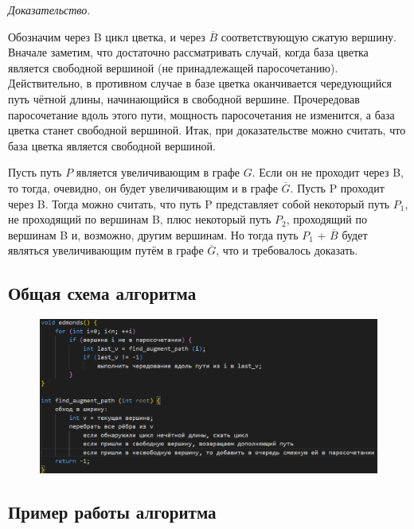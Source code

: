 \documentclass[14pt, a4paper]{extarticle}
\begin{document}
    \textit{Доказательство}. 
    
    Обозначим через B цикл цветка, и через $\overline B$ соответствующую сжатую вершину.
    Вначале заметим, что достаточно рассматривать случай, когда база цветка является свободной вершиной (не принадлежащей паросочетанию). Действительно, в противном случае в базе цветка оканчивается чередующийся путь чётной длины, начинающийся в свободной вершине. Прочередовав паросочетание вдоль этого пути, мощность паросочетания не изменится, а база цветка станет свободной вершиной. Итак, при доказательстве можно считать, что база цветка является свободной вершиной.

    Пусть путь $P$ является увеличивающим в графе $G$. Если он не проходит через B, то тогда, очевидно, он будет увеличивающим и в графе $\overline G$. Пусть P проходит через B. Тогда можно считать, что путь P представляет собой некоторый путь $P_1$, не проходящий по вершинам B, плюс некоторый путь $P_2$, проходящий по вершинам B и, возможно, другим вершинам. Но тогда путь $P_1$ + $\overline B$ будет являться увеличивающим путём в графе $\overline G$, что и требовалось доказать.

    \pagebreak
    
    \subsection*{Общая схема алгоритма}

    \begin{figure}[h!]
        \centering
        \includegraphics[scale=0.9]{psevdo.png}
        \label{fig:my_label}
    \end{figure}

    \pagebreak
    
    \subsection*{Пример работы алгоритма}
\end{document}
